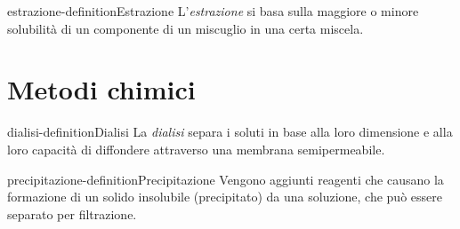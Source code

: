 \documentclass[preview]{standalone}
\begin{document}
\begin{snippetdefinition}{estrazione-definition}{Estrazione}
    L'\textit{estrazione} si basa sulla maggiore o minore solubilità di un componente di un miscuglio in una certa miscela.
\end{snippetdefinition}

\section{Metodi chimici}


\begin{snippetdefinition}{dialisi-definition}{Dialisi}
    La \textit{dialisi} separa i soluti in base alla loro dimensione e alla loro capacità di diffondere attraverso una
    membrana semipermeabile.
\end{snippetdefinition}

\begin{snippetdefinition}{precipitazione-definition}{Precipitazione}
    Vengono aggiunti reagenti che causano la formazione di un solido insolubile (precipitato)
    da una soluzione, che può essere separato per filtrazione.
\end{snippetdefinition}
\end{document}
